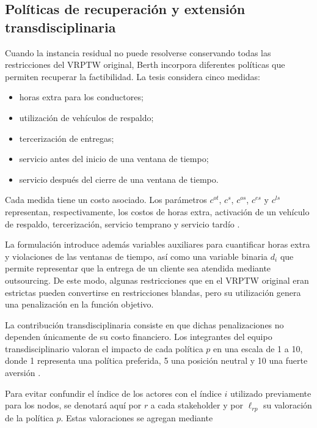 \documentclass[11pt]{article}
\begin{document}
\subsection{Políticas de recuperación y extensión transdisciplinaria}

Cuando la instancia residual no puede resolverse conservando todas las restricciones
del VRPTW original, Berth incorpora diferentes políticas que permiten recuperar la
factibilidad. La tesis considera cinco medidas:

\begin{itemize}
    \item horas extra para los conductores;
    \item utilización de vehículos de respaldo;
    \item tercerización de entregas;
    \item servicio antes del inicio de una ventana de tiempo;
    \item servicio después del cierre de una ventana de tiempo.
\end{itemize}

Cada medida tiene un costo asociado. Los parámetros \(c^{ot}\), \(c^{s}\),
\(c^{os}\), \(c^{es}\) y \(c^{ls}\) representan, respectivamente, los costos de
horas extra, activación de un vehículo de respaldo, tercerización, servicio temprano
y servicio tardío
\parencite{berth_thesis_2025}.

La formulación introduce además variables auxiliares para cuantificar horas extra y
violaciones de las ventanas de tiempo, así como una variable binaria \(d_i\) que
permite representar que la entrega de un cliente sea atendida mediante outsourcing.
De este modo, algunas restricciones que en el VRPTW original eran estrictas pueden
convertirse en restricciones blandas, pero su utilización genera una penalización en
la función objetivo.

La contribución transdisciplinaria consiste en que dichas penalizaciones no dependen
únicamente de su costo financiero. Los integrantes del equipo transdisciplinario
valoran el impacto de cada política \(p\) en una escala de 1 a 10, donde 1 representa
una política preferida, 5 una posición neutral y 10 una fuerte aversión
\parencite{berth_thesis_2025}.

Para evitar confundir el índice de los actores con el índice \(i\) utilizado previamente
para los nodos, se denotará aquí por \(r\) a cada stakeholder y por
\(\ell_{rp}\) su valoración de la política \(p\). Estas valoraciones se agregan mediante
\end{document}
